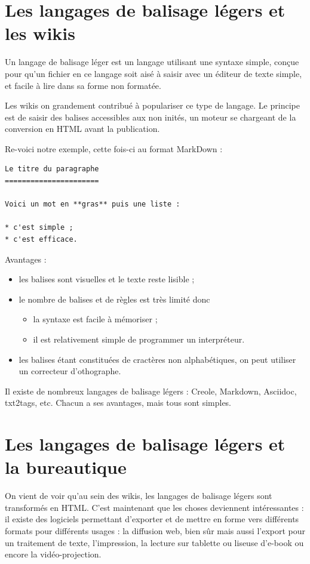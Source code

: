 \documentclass[12pt]{article}
\begin{document}
\section{Les langages de balisage légers et les wikis}

Un langage de balisage léger est un langage utilisant une syntaxe
simple, conçue pour qu'un fichier en ce langage soit aisé à saisir avec
un éditeur de texte simple, et facile à lire dans sa forme non formatée.

Les wikis on grandement contribué à populariser ce type de langage. Le
principe est de saisir des balises accessibles aux non inités, un moteur
se chargeant de la conversion en HTML avant la publication.

Re-voici notre exemple, cette fois-ci au format MarkDown :

\begin{verbatim}
Le titre du paragraphe
======================

Voici un mot en **gras** puis une liste :

* c'est simple ;
* c'est efficace.
\end{verbatim}
Avantages :

\begin{itemize}
\item
  les balises sont visuelles et le texte reste lisible ;
\item
  le nombre de balises et de règles est très limité donc
  \begin{itemize}
  \item
    la syntaxe est facile à mémoriser ;
  \item
    il est relativement simple de programmer un interpréteur.
  \end{itemize}
\item
  les balises étant constituées de cractères non alphabétiques, on peut
  utiliser un correcteur d'othographe.
\end{itemize}
Il existe de nombreux langages de balisage légers : Creole, Markdown,
Asciidoc, txt2tags, etc. Chacun a ses avantages, mais tous sont simples.

\section{Les langages de balisage légers et la bureautique}

On vient de voir qu'au sein des wikis, les langages de balisage légers
sont transformés en HTML. C'est maintenant que les choses deviennent
intéressantes : il existe des logiciels permettant d'exporter et de
mettre en forme vers différents formats pour différents usages : la
diffusion web, bien sûr mais aussi l'export pour un traitement de texte,
l'impression, la lecture sur tablette ou liseuse d'e-book ou encore la
vidéo-projection.
\end{document}
